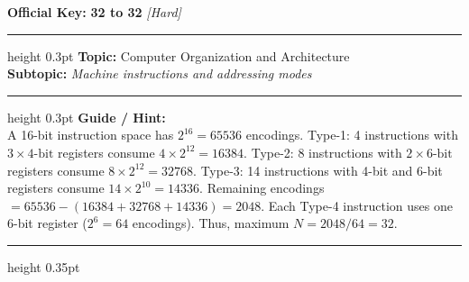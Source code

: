 \documentclass[a4paper,10pt]{article}
\begin{document}
\begin{tcolorbox}
\textbf{Official Key:} \textbf{\large 32 to 32} \hfill \textit{\small [Hard]}
\vspace{2pt}\hrule height 0.3pt\vspace{3pt}
\textbf{Topic:} Computer Organization and Architecture \\
\textbf{Subtopic:} \textit{Machine instructions and addressing modes}
\vspace{2pt}\hrule height 0.3pt\vspace{3pt}
\textbf{Guide / Hint:} \\
{\small A 16-bit instruction space has $2^{16} = 65536$ encodings. Type-1: 4 instructions with $3 \times 4\text{-bit}$ registers consume $4 \times 2^{12} = 16384$. Type-2: 8 instructions with $2 \times 6\text{-bit}$ registers consume $8 \times 2^{12} = 32768$. Type-3: 14 instructions with 4-bit and 6-bit registers consume $14 \times 2^{10} = 14336$. Remaining encodings $= 65536 - (16384 + 32768 + 14336) = 2048$. Each Type-4 instruction uses one 6-bit register ($2^6 = 64$ encodings). Thus, maximum $N = 2048 / 64 = 32$.}

\end{tcolorbox}
\vspace{6pt}\hrule height 0.35pt\vspace{6pt}
\noindent
\end{document}
